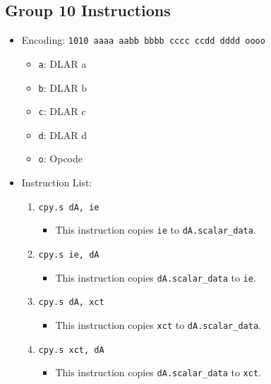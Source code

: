 \documentclass{article}
\begin{document}
	\subsection{Group 10 Instructions}
		\begin{itemize}
		\item Encoding: \texttt{1010 aaaa aabb bbbb  cccc ccdd dddd oooo}
			\begin{itemize}
			\item \texttt{a}: DLAR a
			\item \texttt{b}: DLAR b
			\item \texttt{c}: DLAR c
			\item \texttt{d}: DLAR d
			\item \texttt{o}: Opcode
			\end{itemize}
		\item Instruction List:
			\begin{enumerate}
			\item \texttt{cpy.s dA, ie}
				\begin{itemize}
				\item This instruction copies \texttt{ie} to
					\texttt{dA.scalar\_data}.
				\end{itemize}
			\item \texttt{cpy.s ie, dA}
				\begin{itemize}
				\item This instruction copies \texttt{dA.scalar\_data} to
					\texttt{ie}.
				\end{itemize}
			\item \texttt{cpy.s dA, xct}
				\begin{itemize}
				\item This instruction copies \texttt{xct} to
					\texttt{dA.scalar\_data}.
				\end{itemize}
			\item \texttt{cpy.s xct, dA}
				\begin{itemize}
				\item This instruction copies \texttt{dA.scalar\_data} to
					\texttt{xct}.
				\end{itemize}


\end{enumerate}
\end{itemize}
\end{document}
